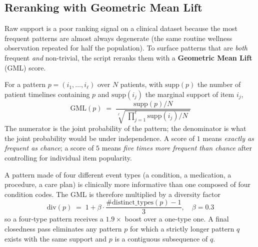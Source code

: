 \subsection{Reranking with Geometric Mean Lift}
\label{subsec:gml}

Raw support is a poor ranking signal on a clinical dataset because the most frequent patterns are almost always degenerate (the same routine wellness observation repeated for half the population). To surface patterns that are \emph{both} frequent \emph{and} non-trivial, the script reranks them with a \textbf{Geometric Mean Lift} (GML) score.

For a pattern $p = (i_1, \dots, i_\ell)$ over $N$ patients, with $\text{supp}(p)$ the number of patient timelines containing $p$ and $\text{supp}(i_j)$ the marginal support of item $i_j$,
\begin{equation}
    \text{GML}(p) \;=\; \frac{\text{supp}(p)/N}{\sqrt[\ell]{\;\prod_{j=1}^{\ell} \text{supp}(i_j)/N\;}}
    \label{eq:gml}
\end{equation}
The numerator is the joint probability of the pattern; the denominator is what the joint probability would be under independence. A score of $1$ means \emph{exactly as frequent as chance}; a score of $5$ means \emph{five times more frequent than chance} after controlling for individual item popularity.

A pattern made of four different event types (a condition, a medication, a procedure, a care plan) is clinically more informative than one composed of four condition codes. The GML is therefore multiplied by a diversity factor
\begin{equation*}
    \text{div}(p) \;=\; 1 + \beta \cdot \frac{\#\text{distinct\_types}(p) - 1}{3}, \quad \beta = 0.3
\end{equation*}
so a four-type pattern receives a $1.9\times$ boost over a one-type one. A final closedness pass eliminates any pattern $p$ for which a strictly longer pattern $q$ exists with the same support and $p$ is a contiguous subsequence of $q$.
